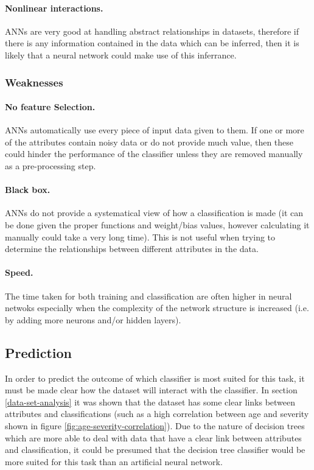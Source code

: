 \documentclass[12pt]{article}
\begin{document}
      \paragraph{Nonlinear interactions.}
        ANNs are very good at handling abstract relationships in datasets, therefore if there is any information contained in the data which can be inferred, then it is likely that a neural network could make use of this inferrance.

    \subsubsection{Weaknesses}
      \paragraph{No feature Selection.}
        ANNs automatically use every piece of input data given to them. If one or more of the attributes contain noisy data or do not provide much value, then these could hinder the performance of the classifier unless they are removed manually as a pre-processing step.

      \paragraph{Black box.}
        ANNs do not provide a systematical view of how a classification is made (it can be done given the proper functions and weight/bias values, however calculating it manually could take a very long time). This is not useful when trying to determine the relationships between different attributes in the data.

      \paragraph{Speed.}
        The time taken for both training and classification are often higher in neural netwoks especially when the complexity of the network structure is increased (i.e. by adding more neurons and/or hidden layers).

  \subsection{Prediction}
    In order to predict the outcome of which classifier is most suited for this task, it must be made clear how the dataset will interact with the classifier.
    In section \ref{data-set-analysis} it was shown that the dataset has some clear links between attributes and classifications (such as a high correlation between age and severity shown in figure \ref{fig:age-severity-correlation}). Due to the nature of decision trees which are more able to deal with data that have a clear link between attributes and classification, it could be presumed that the decision tree classifier would be more suited for this task than an artificial neural network.
\end{document}
